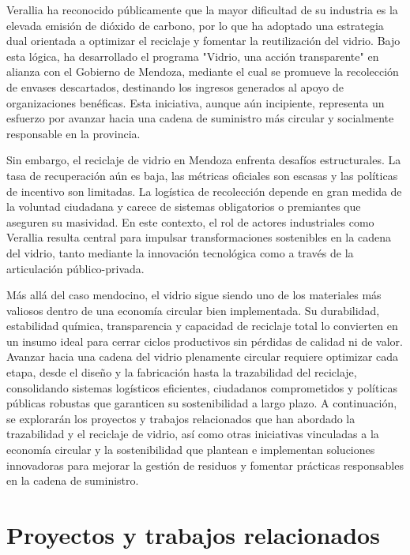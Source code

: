 Verallia ha reconocido públicamente que la mayor dificultad de su industria es la elevada emisión de dióxido de carbono, por lo que ha adoptado una estrategia dual orientada a optimizar el reciclaje y fomentar la reutilización del vidrio. Bajo esta lógica, ha desarrollado el programa "Vidrio, una acción transparente" en alianza con el Gobierno de Mendoza, mediante el cual se promueve la recolección de envases descartados, destinando los ingresos generados al apoyo de organizaciones benéficas. Esta iniciativa, aunque aún incipiente, representa un esfuerzo por avanzar hacia una cadena de suministro más circular y socialmente responsable en la provincia.

Sin embargo, el reciclaje de vidrio en Mendoza enfrenta desafíos estructurales. La tasa de recuperación aún es baja, las métricas oficiales son escasas y las políticas de incentivo son limitadas. La logística de recolección depende en gran medida de la voluntad ciudadana y carece de sistemas obligatorios o premiantes que aseguren su masividad. En este contexto, el rol de actores industriales como Verallia resulta central para impulsar transformaciones sostenibles en la cadena del vidrio, tanto mediante la innovación tecnológica como a través de la articulación público-privada.

Más allá del caso mendocino, el vidrio sigue siendo uno de los materiales más valiosos dentro de una economía circular bien implementada. Su durabilidad, estabilidad química, transparencia y capacidad de reciclaje total lo convierten en un insumo ideal para cerrar ciclos productivos sin pérdidas de calidad ni de valor. Avanzar hacia una cadena del vidrio plenamente circular requiere optimizar cada etapa, desde el diseño y la fabricación hasta la trazabilidad del reciclaje, consolidando sistemas logísticos eficientes, ciudadanos comprometidos y políticas públicas robustas que garanticen su sostenibilidad a largo plazo. A continuación, se explorarán los proyectos y trabajos relacionados que han abordado la trazabilidad y el reciclaje de vidrio, así como otras iniciativas vinculadas a la economía circular y la sostenibilidad que plantean e implementan soluciones innovadoras para mejorar la gestión de residuos y fomentar prácticas responsables en la cadena de suministro.

\section{Proyectos y trabajos relacionados}

